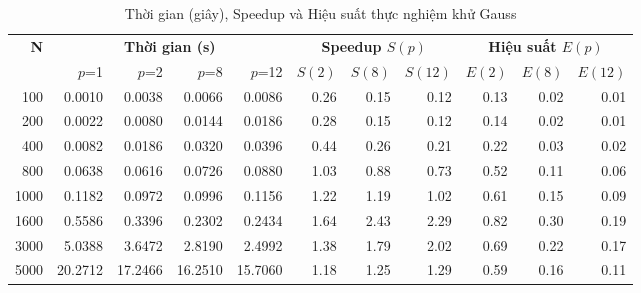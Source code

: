 \begin{table}[H]
  \centering
  \caption{Thời gian (giây), Speedup và Hiệu suất thực nghiệm khử Gauss}
  \label{tab:gauss_benchmark}
  \vspace{0.2cm}
  \small
  \begin{tabular}{r|rrrr|rrr|rrr}
    \toprule
    \textbf{N} & \multicolumn{4}{c|}{\textbf{Thời gian (s)}} & \multicolumn{3}{c|}{\textbf{Speedup $S(p)$}} & \multicolumn{3}{c}{\textbf{Hiệu suất $E(p)$}}                                                                   \\
               & $p$=1                                       & $p$=2                                        & $p$=8                                         & $p$=12  & $S(2)$ & $S(8)$ & $S(12)$ & $E(2)$ & $E(8)$ & $E(12)$ \\
    \midrule
    100        & 0.0010                                      & 0.0038                                       & 0.0066                                        & 0.0086  & 0.26   & 0.15   & 0.12    & 0.13   & 0.02   & 0.01    \\
    200        & 0.0022                                      & 0.0080                                       & 0.0144                                        & 0.0186  & 0.28   & 0.15   & 0.12    & 0.14   & 0.02   & 0.01    \\
    400        & 0.0082                                      & 0.0186                                       & 0.0320                                        & 0.0396  & 0.44   & 0.26   & 0.21    & 0.22   & 0.03   & 0.02    \\
    800        & 0.0638                                      & 0.0616                                       & 0.0726                                        & 0.0880  & 1.03   & 0.88   & 0.73    & 0.52   & 0.11   & 0.06    \\
    1000       & 0.1182                                      & 0.0972                                       & 0.0996                                        & 0.1156  & 1.22   & 1.19   & 1.02    & 0.61   & 0.15   & 0.09    \\
    1600       & 0.5586                                      & 0.3396                                       & 0.2302                                        & 0.2434  & 1.64   & 2.43   & 2.29    & 0.82   & 0.30   & 0.19    \\
    3000       & 5.0388                                      & 3.6472                                       & 2.8190                                        & 2.4992  & 1.38   & 1.79   & 2.02    & 0.69   & 0.22   & 0.17    \\
    5000       & 20.2712                                     & 17.2466                                      & 16.2510                                       & 15.7060 & 1.18   & 1.25   & 1.29    & 0.59   & 0.16   & 0.11    \\
    \bottomrule
  \end{tabular}
\end{table}

